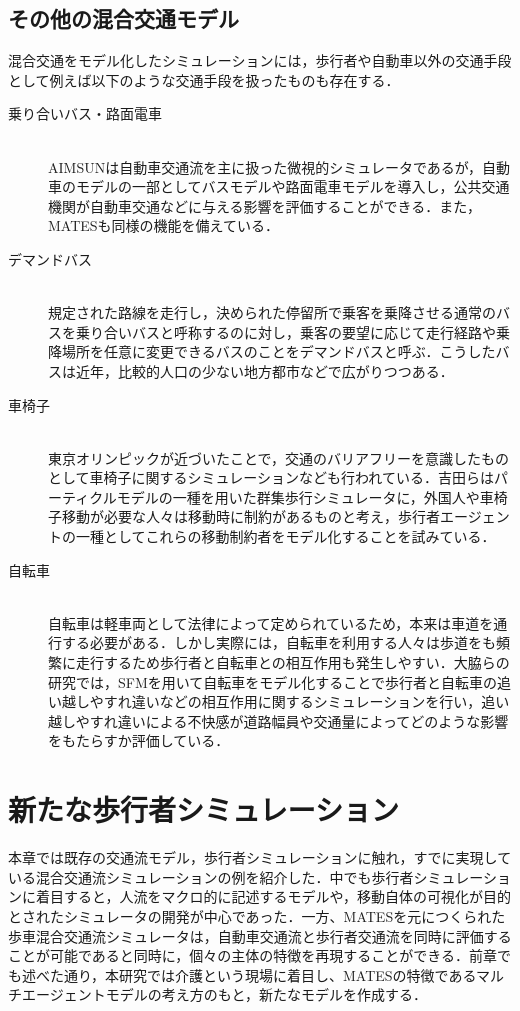 \subsection{その他の混合交通モデル}

混合交通をモデル化したシミュレーションには，歩行者や自動車以外の交通手段として例えば以下のような交通手段を扱ったものも存在する．

\begin{description}
  \item[乗り合いバス・路面電車]\mbox{}\\
  AIMSUN\cite{dynamic_simulation}は自動車交通流を主に扱った微視的シミュレータであるが，自動車のモデルの一部としてバスモデルや路面電車モデルを導入し，公共交通機関が自動車交通などに与える影響を評価することができる．また，MATESも同様の機能を備えている．
  \item[デマンドバス]\mbox{}\\
  規定された路線を走行し，決められた停留所で乗客を乗降させる通常のバスを乗り合いバスと呼称するのに対し，乗客の要望に応じて走行経路や乗降場所を任意に変更できるバスのことをデマンドバスと呼ぶ．こうしたバスは近年，比較的人口の少ない地方都市などで広がりつつある．
  \item[車椅子]\mbox{}\\
  東京オリンピックが近づいたことで，交通のバリアフリーを意識したものとして車椅子に関するシミュレーションなども行われている．吉田らはパーティクルモデルの一種を用いた群集歩行シミュレータに，外国人や車椅子移動が必要な人々は移動時に制約があるものと考え，歩行者エージェントの一種としてこれらの移動制約者をモデル化することを試みている\cite{escape_simulation}．
  \item[自転車]\mbox{}\\
  自転車は軽車両として法律によって定められているため，本来は車道を通行する必要がある．しかし実際には，自転車を利用する人々は歩道をも頻繁に走行するため歩行者と自転車との相互作用も発生しやすい．大脇らの研究では，SFMを用いて自転車をモデル化することで歩行者と自転車の追い越しやすれ違いなどの相互作用に関するシミュレーションを行い，追い越しやすれ違いによる不快感が道路幅員や交通量によってどのような影響をもたらすか評価している\cite{necessity}．
\end{description}

\section{新たな歩行者シミュレーション}

本章では既存の交通流モデル，歩行者シミュレーションに触れ，すでに実現している混合交通流シミュレーションの例を紹介した．中でも歩行者シミュレーションに着目すると，人流をマクロ的に記述するモデルや，移動自体の可視化が目的とされたシミュレータの開発が中心であった．一方、MATESを元につくられた歩車混合交通流シミュレータは，自動車交通流と歩行者交通流を同時に評価することが可能であると同時に，個々の主体の特徴を再現することができる．前章でも述べた通り，本研究では介護という現場に着目し、MATESの特徴であるマルチエージェントモデルの考え方のもと，新たなモデルを作成する．

